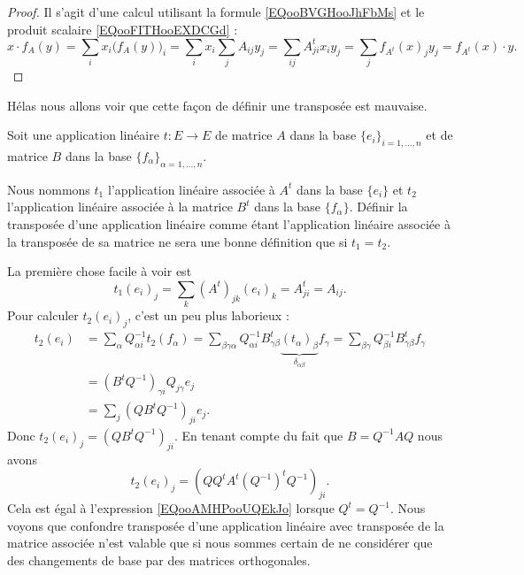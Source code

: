 \begin{proof}
    Il s'agit d'une calcul utilisant la formule \eqref{EQooBVGHooJhFbMs} et le produit scalaire \eqref{EQooFITHooEXDCGd} :
    \begin{equation}
        x\cdot f_A(y)=\sum_ix_i\big( f_A(y) \big)_i=\sum_ix_i\sum_jA_{ij}y_j=\sum_{ij}A^t_{ji}x_iy_j=\sum_jf_{A^t}(x)_jy_j=f_{A^t}(x)\cdot y.
    \end{equation}
\end{proof}

Hélas nous allons voir que cette façon de définir une transposée est mauvaise.

Soit une application linéaire \( t\colon E\to E\) de matrice \( A\) dans la base \( \{ e_i \}_{i=1,\ldots, n}\) et de matrice \( B\) dans la base \( \{ f_{\alpha} \}_{\alpha=1,\ldots, n}\).

Nous nommons \( t_1\) l'application linéaire associée à \( A^t\) dans la base \( \{ e_i \}\) et \( t_2\) l'application linéaire associée à la matrice \( B^t\) dans la base \( \{ f_{\alpha} \}\). Définir la transposée d'une application linéaire comme étant l'application linéaire associée à la transposée de sa matrice ne sera une bonne définition que si \( t_1=t_2\).

La première chose facile à voir est
\begin{equation}        \label{EQooAMHPooUQEkJo}
    t_1(e_i)_j=\sum_k(A^t)_{jk}(e_i)_k=A^t_{ji}=A_{ij}.
\end{equation}
Pour calculer \( t_2(e_i)_j\), c'est un peu plus laborieux :
\begin{subequations}
    \begin{align}
        t_2(e_i)&=\sum_{\alpha}Q_{\alpha i}^{-1} t_2(f_\alpha)=\sum_{\beta\gamma\alpha}Q_{\alpha i}^{-1}B^t_{\gamma\beta}\underbrace{(t_{\alpha})_{\beta}}_{\delta_{\alpha\beta}}f_{\gamma}=\sum_{\beta\gamma}Q_{\beta i}^{-1}B^t_{\gamma\beta}f_{\gamma}\\
        &=(B^tQ^{-1})_{\gamma i}Q_{j\gamma}e_j\\
        &=\sum_j(QB^tQ^{-1})_{ji}e_j.
    \end{align}
\end{subequations}
Donc \( t_2(e_i)_j=(QB^tQ^{-1})_{ji}\). En tenant compte du fait que \( B=Q^{-1}AQ\) nous avons
\begin{equation}
    t_2(e_i)_j=(QQ^tA^t(Q^{-1})^tQ^{-1})_{ji}.
\end{equation}
Cela est égal à l'expression \eqref{EQooAMHPooUQEkJo} lorsque \( Q^t=Q^{-1}\). Nous voyons que confondre transposée d'une application linéaire avec transposée de la matrice associée n'est valable que si nous sommes certain de ne considérer que des changements de base par des matrices orthogonales.

